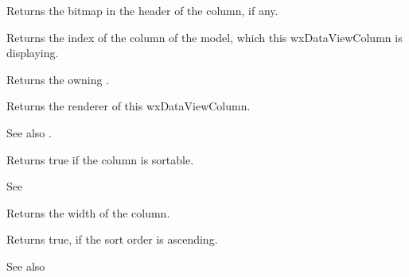 \label{wxdataviewcolumngetbitmap}


Returns the bitmap in the header of the column, if any.

\label{wxdataviewcolumngetmodelcolumn}


Returns the index of the column of the model, which this
wxDataViewColumn is displaying.

\label{wxdataviewcolumngetowner}


Returns the owning .

\label{wxdataviewcolumngetrenderer}


Returns the renderer of this wxDataViewColumn.

See also .

\label{wxdataviewcolumngetsortable}


Returns true if the column is sortable.

See 

\label{wxdataviewcolumngetwidth}


Returns the width of the column.

\label{wxdataviewcolumnissortorderascending}


Returns true, if the sort order is ascending.

See also 

\label{wxdataviewcolumnsetalignment}


